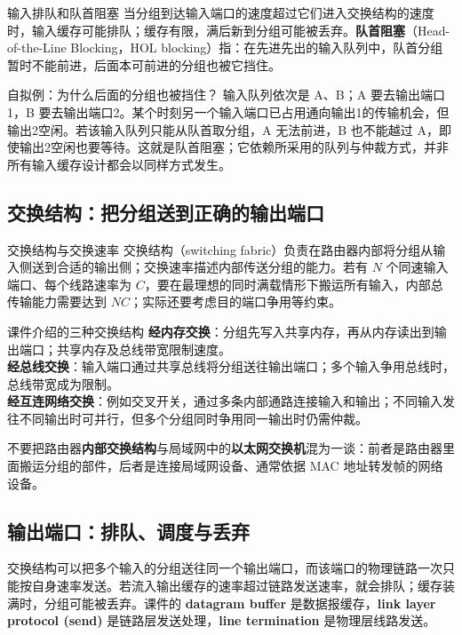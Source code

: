 \begin{proposition}{输入排队和队首阻塞}
当分组到达输入端口的速度超过它们进入交换结构的速度时，输入缓存可能排队；缓存有限，满后新到分组可能被丢弃。\textbf{队首阻塞}（Head-of-the-Line Blocking，HOL blocking）指：在先进先出的输入队列中，队首分组暂时不能前进，后面本可前进的分组也被它挡住。
\end{proposition}

\begin{example}{自拟例：为什么后面的分组也被挡住？}
输入队列依次是 A、B；A 要去输出端口1，B 要去输出端口2。某个时刻另一个输入端口已占用通向输出1的传输机会，但输出2空闲。若该输入队列只能从队首取分组，A 无法前进，B 也不能越过 A，即使输出2空闲也要等待。这就是队首阻塞；它依赖所采用的队列与仲裁方式，并非所有输入缓存设计都会以同样方式发生。
\end{example}
\annotationarea[4]

\subsection{交换结构：把分组送到正确的输出端口}
\begin{definition}{交换结构与交换速率}
交换结构（switching fabric）负责在路由器内部将分组从输入侧送到合适的输出侧；交换速率描述内部传送分组的能力。若有 $N$ 个同速输入端口、每个线路速率为 $C$，要在最理想的同时满载情形下搬运所有输入，内部总传输能力需要达到 $NC$；实际还要考虑目的端口争用等约束。
\end{definition}

\begin{proposition}{课件介绍的三种交换结构}
\textbf{经内存交换}：分组先写入共享内存，再从内存读出到输出端口；共享内存及总线带宽限制速度。\\
\textbf{经总线交换}：输入端口通过共享总线将分组送往输出端口；多个输入争用总线时，总线带宽成为限制。\\
\textbf{经互连网络交换}：例如交叉开关，通过多条内部通路连接输入和输出；不同输入发往不同输出时可并行，但多个分组同时争用同一输出时仍需仲裁。
\end{proposition}

不要把路由器\textbf{内部交换结构}与局域网中的\textbf{以太网交换机}混为一谈：前者是路由器里面搬运分组的部件，后者是连接局域网设备、通常依据 MAC 地址转发帧的网络设备。
\annotationarea[4]

\subsection{输出端口：排队、调度与丢弃}
交换结构可以把多个输入的分组送往同一个输出端口，而该端口的物理链路一次只能按自身速率发送。若流入输出缓存的速率超过链路发送速率，就会排队；缓存装满时，分组可能被丢弃。课件的 \textbf{datagram buffer} 是数据报缓存，\textbf{link layer protocol (send)} 是链路层发送处理，\textbf{line termination} 是物理层线路发送。

